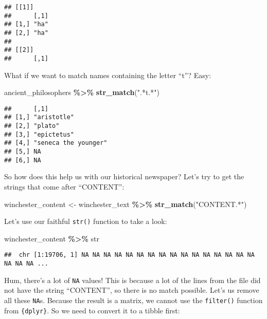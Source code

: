 \documentclass[
]{article}
\newenvironment{Shaded}{\begin{snugshade}}{\end{snugshade}}
\newcommand{\KeywordTok}[1]{\textcolor[rgb]{0.13,0.29,0.53}{\textbf{#1}}}
\newcommand{\NormalTok}[1]{#1}
\newcommand{\OperatorTok}[1]{\textcolor[rgb]{0.81,0.36,0.00}{\textbf{#1}}}
\newcommand{\StringTok}[1]{\textcolor[rgb]{0.31,0.60,0.02}{#1}}
\begin{document}
\begin{verbatim}
## [[1]]
##      [,1]
## [1,] "ha"
## [2,] "ha"
## 
## [[2]]
##      [,1]
\end{verbatim}

What if we want to match names containing the letter ``t''? Easy:

\begin{Shaded}
\begin{Highlighting}[]
\NormalTok{ancient\_philosophers }\OperatorTok{\%\textgreater{}\%}
\StringTok{  }\KeywordTok{str\_match}\NormalTok{(}\StringTok{".*t.*"}\NormalTok{)}
\end{Highlighting}
\end{Shaded}

\begin{verbatim}
##      [,1]                
## [1,] "aristotle"         
## [2,] "plato"             
## [3,] "epictetus"         
## [4,] "seneca the younger"
## [5,] NA                  
## [6,] NA
\end{verbatim}

So how does this help us with our historical newspaper? Let's try to get the strings that come
after ``CONTENT'':

\begin{Shaded}
\begin{Highlighting}[]
\NormalTok{winchester\_content \textless{}{-}}\StringTok{ }\NormalTok{winchester\_text }\OperatorTok{\%\textgreater{}\%}
\StringTok{  }\KeywordTok{str\_match}\NormalTok{(}\StringTok{"CONTENT.*"}\NormalTok{)}
\end{Highlighting}
\end{Shaded}

Let's use our faithful \texttt{str()} function to take a look:

\begin{Shaded}
\begin{Highlighting}[]
\NormalTok{winchester\_content }\OperatorTok{\%\textgreater{}\%}
\StringTok{  }\NormalTok{str}
\end{Highlighting}
\end{Shaded}

\begin{verbatim}
##  chr [1:19706, 1] NA NA NA NA NA NA NA NA NA NA NA NA NA NA NA NA NA NA NA ...
\end{verbatim}

Hum, there's a lot of \texttt{NA} values! This is because a lot of the lines from the file did not have the
string ``CONTENT'', so there is no match possible. Let's us remove all these \texttt{NA}s. Because the
result is a matrix, we cannot use the \texttt{filter()} function from \texttt{\{dplyr\}}. So we need to convert it
to a tibble first:
\end{document}
